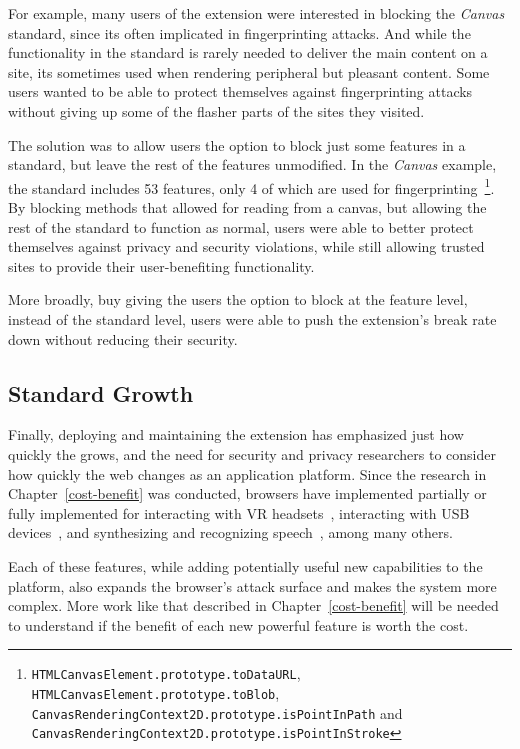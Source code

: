 For example, many users of the extension were interested in blocking the
\textit{Canvas} standard, since its often implicated in fingerprinting attacks.
And while the functionality in the standard is rarely needed to deliver the
main content on a site, its sometimes used when rendering peripheral but
pleasant content.  Some users wanted to be able to protect themselves against
fingerprinting attacks without giving up some of the flasher parts of the sites
they visited.

The solution was to allow users the option to block
just some features in a standard, but leave the rest of the features
unmodified.  In the \textit{Canvas} example, the standard includes 53 features,
only 4 of which are used for fingerprinting~\footnote{%
\texttt{HTMLCanvasElement.prototype.toDataURL},
\texttt{HTMLCanvasElement.prototype.toBlob},
\texttt{CanvasRenderingContext2D.prototype.isPointInPath} and
\texttt{CanvasRenderingContext2D.prototype.isPointInStroke}}.  By blocking
methods that allowed for reading from a canvas, but allowing the rest of the
standard to function as normal, users were able to better protect themselves against
privacy and security violations, while still allowing trusted sites to provide
their user-benefiting functionality.

More broadly, buy giving the users the option to block at the feature level,
instead of the standard level, users were able to push the extension's break
rate down without reducing their security.


\subsection{\WAPI Standard Growth}
Finally, deploying and maintaining the extension has emphasized just how
quickly the \WAPI grows, and the need for security and privacy
researchers to consider how quickly the web changes as an application
platform.  Since the research in Chapter~\ref{cost-benefit} was conducted,
browsers have implemented partially or fully implemented \WAS for interacting
with VR headsets~\cite{webvrstandard}, interacting with USB
devices~\cite{webusbstandard}, and synthesizing and recognizing
speech~\cite{speechtandard}, among many others.

Each of these features, while adding potentially useful new capabilities to the
platform, also expands the browser's attack surface and makes the system more
complex.  More work like that described in Chapter~\ref{cost-benefit} will be
needed to understand if the benefit of each new powerful feature is worth the
cost.
